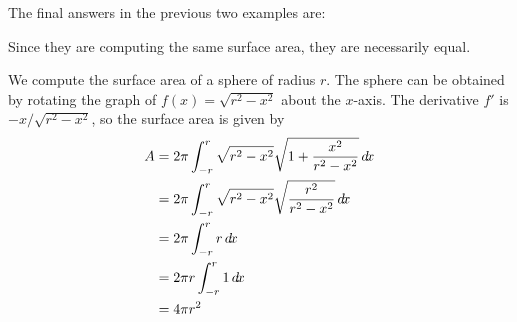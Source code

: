 \documentclass{ximera}
\begin{document}
\begin{question}
  The final answers in the previous two examples are:
  \begin{multipleChoice}
  \end{multipleChoice}
  \begin{feedback}
    Since they are computing the same surface area, they are necessarily equal.
  \end{feedback}
\end{question}










  




\begin{example}
  We compute the surface area of a sphere of radius $r$.  The sphere
  can be obtained by rotating the graph of $f(x)=\sqrt{r^2 - x^2}$
  about the $x$-axis.  The derivative $f'$ is $-x/\sqrt{r^2-x^2}$,
  so the surface area is given by
  \begin{align*}
    A&=2\pi \int_{-r }^r \sqrt{r^2 - x^2}\sqrt{1+\frac{x^2}{r^2-x^2}}\d x \\
    &=2\pi \int_{-r }^r \sqrt{r^2 - x^2}\sqrt{\frac{r^2}{r^2-x^2}}\d x \\
    &=2\pi \int_{-r }^r r\d x\\
    &=2\pi r\int_{-r }^r 1\d x\\
    &=4\pi r^2
  \end{align*}
\end{example}
\end{document}
